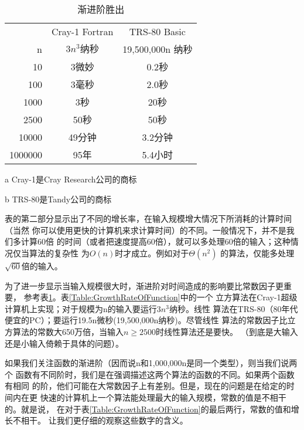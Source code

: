 \begin{table}
    \centering
    \begin{threeparttable}
    \begin{tabular}{rcc}
        \hline
        &Cray-1 Fortran\tnote{a} &TRS-80 Basic\tnote{b} \\
        n  & $3n^3 纳秒$  & 19,500,000n 纳秒\\
        \hline
        10 &3微妙 & 0.2秒\\
        100 &3毫秒 & 2.0秒\\
        1000 & 3秒 & 20秒\\
        2500 & 50秒 &50秒\\
        10000 & 49分钟 & 3.2分钟\\
        1000000 & 95年  &5.4小时\\
        \hline
    \end{tabular}
    \begin{tablenotes}
        \item [a] Cray-1是Cray Research公司的商标
        \item [b] TRS-80是Tandy公司的商标
    \end{tablenotes}
    \caption{渐进阶胜出}
    \label{Table:AsymptoteOrder}
    \end{threeparttable}
\end{table}

表的第二部分显示出了不同的增长率，在输入规模增大情况下所消耗的计算时间（当然
你可以使用更快的计算机来求计算时间）的不同。一般情况下，并不是我们多计算60倍
的时间（或者把速度提高60倍），就可以多处理60倍的输入；这种情况仅当算法的复杂性
为$O(n)$时才成立。例如对于$\Theta(n^2)$ 的算法，仅能多处理$\sqrt{60}$倍的输入。

为了进一步显示当输入规模很大时，渐进阶对时间造成的影响要比常数因子更重要，
参考表\ref{Table:AsymptoteOrder}。表\ref{Table:GrowthRateOfFunction}中的一个
立方算法在Cray-1超级计算机上实现；对于规模为n的输入要运行$3n^3$纳秒。线性
算法在TRS-80（80年代便宜的PC）；要运行19.5n微秒(19,500,000n纳秒)。尽管线性
算法的常数因子比立方算法的常数大650万倍，当输入$n\geq 2500$时线性算法还是要快。
（到底是大输入还是小输入倚赖于具体的问题）。

如果我们关注函数的渐进阶（因而说n和1,000,000n是同一个类型），则当我们说两个
函数有不同阶时，我们是在强调描述这两个算法的函数的不同。如果两个函数有相同
的阶，他们可能在大常数因子上有差别。但是，现在的问题是在给定的时间内在更
快速的计算机上一个算法能处理最大的输入规模，常数的值是不相干的。就是说，
在对于表\ref{Table:GrowthRateOfFunction}的最后两行，常数的值和增长不相干。
让我们更仔细的观察这些数字的含义。

